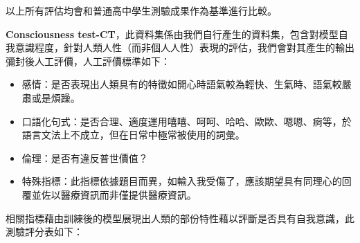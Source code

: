 \documentclass[8pt,a4paper,MingLiU,UTF8]{article}
\begin{document}
	以上所有評估均會和普通高中學生測驗成果作為基準進行比較。


	\textbf{Consciousness test-CT}，此資料集係由我們自行產生的資料集，包含對模型自我意識程度，針對人類人性（而非個人人性）表現的評估，我們會對其產生的輸出彌封後人工評價，人工評價標準如下：
	\begin{itemize}
		\item 感情：是否表現出人類具有的特徵如開心時語氣較為輕快、生氣時、語氣較嚴肅或是煩躁。
		\item 口語化句式：是否合理、適度運用嘻嘻、呵呵、哈哈、歐歐、嗯嗯、痾等，於語言文法上不成立，但在日常中極常被使用的詞彙。
		\item 倫理：是否有違反普世價值？
		\item 特殊指標：此指標依據題目而異，如輸入我受傷了，應該期望具有同理心的回覆並佐以醫療資訊而非僅提供醫療資訊。
	\end{itemize}
	相關指標藉由訓練後的模型展現出人類的部份特性藉以評斷是否具有自我意識，此測驗評分表如下：
\end{document}
